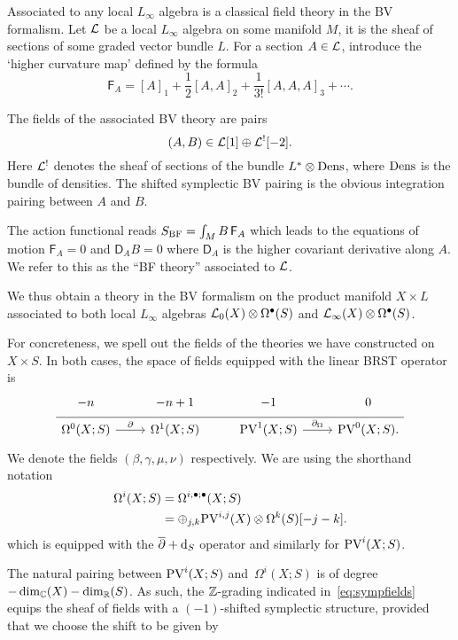 \parsec[s:bf]

Associated to any local $L_\infty$ algebra is a classical field theory in the BV formalism.
Let $\mathcal L$ be a local $L_\infty$ algebra on some manifold $M$, it is the sheaf of sections of some graded vector bundle $L$. 
For a section $A \in \mathcal L$, introduce the `higher curvature map' defined by the formula
\[
\mathsf{F}_A = [A]_1 + \frac12 [A,A]_2 + \frac{1}{3!} [A,A,A]_3 + \cdots .
\]

The fields of the associated BV theory are pairs
\[
  (A, B) \in \mathcal L[1] \oplus \mathcal L^{!}[-2] .
\]
Here $\mathcal L^!$ denotes the sheaf of sections of the bundle $L^* \otimes {\rm Dens}$, where ${\rm Dens}$ is the bundle of densities. 
The shifted symplectic BV pairing is the obvious integration pairing between $A$ and $B$. 

The action functional reads $S_{\rm BF} = \int_M B \, \mathsf{F}_{A}$ which leads to the equations of motion $\mathsf{F}_{A} = 0$ and $\mathsf{D}_A B= 0$ where $\mathsf{D}_A$ is the higher covariant derivative along $A$. 
We refer to this as the ``BF theory'' associated to $\mathcal L$.

We thus obtain a theory in the BV formalism on the product manifold $X \times L$ associated to both local $L_\infty$ algebras $\mathcal L_0(X) \otimes \Omega^{\bullet}(S)$ and $\mathcal L_\infty(X) \otimes \Omega^\bullet(S)$.

\parsec
For concreteness, we spell out the fields of the theories we have constructed on $X \times S$.
In both cases, the space of fields equipped with the linear BRST operator is
\begin{equation}
  \label{eq:sympfields} 
  \begin{tikzcd}[row sep = 1 ex]
    -n & -n + 1 & -1 & 0 \\ \hline
    \Omega^{0}(X;S) \ar[r, "\del"] & \Omega^{1}(X;S) & 
     \PV^{1}(X; S) \ar[r, "\div"] & \PV^{0}(X; S).
\end{tikzcd}
\end{equation}
We denote the fields $(\beta,\gamma,\mu,\nu)$ respectively.
We are using the shorthand notation
\begin{align*}
\Omega^{i}(X;S) & = \Omega^{i , \bullet;\bullet}(X;S) \\
 & = \oplus_{j,k} {\rm PV}^{i,j}(X) \otimes \Omega^k(S) [-j-k] .
\end{align*}
which is equipped with the $\overline{\partial} + {\rm d}_S$ operator and similarly for ${\rm PV}^{i}(X;S)$. 

The natural pairing between ${\rm PV}^i(X;S)$ and~$\Omega^i(X;S)$ is of degree $-\dim_{\mathbb{C}}(X) -\dim_{\mathbb{R}}(S)$. 
As such, the $\mathbb{Z}$-grading indicated in~\eqref{eq:sympfields} equips the sheaf of fields with a $(-1)$-shifted symplectic structure, provided that we choose the shift to be given by

